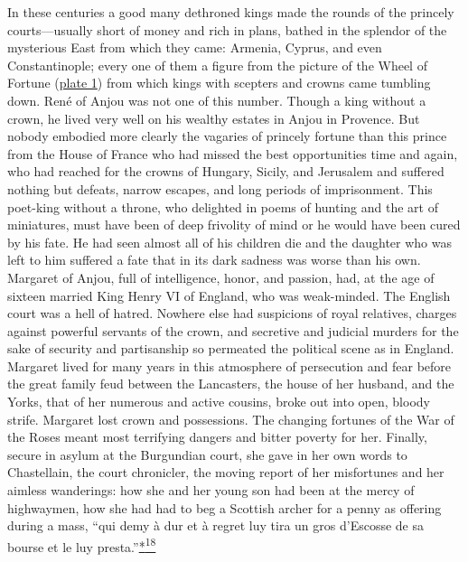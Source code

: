 In these centuries a good many dethroned kings made the rounds of the
princely courts---usually short of money and rich in plans, bathed in
the splendor of the mysterious East from which they came: Armenia,
Cyprus, and even Constantinople; every one of them a figure from the
picture of the Wheel of Fortune
(\protect\hyperlink{20_ILLUSTRATIONS_FOLLOW_PAGE.xhtmlux5cux23id_2}{plate
1}) from which kings with scepters and crowns came tumbling down. René
of Anjou was not one of this number. Though a king without a crown, he
lived very well on his wealthy estates in Anjou in Provence. But nobody
embodied more clearly the vagaries of princely fortune than this prince
from the House of France who had missed the best opportunities time and
again, who had reached for the crowns of Hungary, Sicily, and Jerusalem
and suffered nothing but defeats, narrow escapes, and long periods of
imprisonment. This poet-king without a throne, who delighted in poems of
hunting and the art of miniatures, must have been of deep frivolity of
mind or he would have been cured by his fate. He had seen almost all of
his children die and the daughter who was left to him suffered a fate
that in its dark sadness was worse than his own. Margaret of Anjou, full
of intelligence, honor, and passion, had, at the age of sixteen married
King Henry VI of England, who was weak-minded. The English court was a
hell of hatred. Nowhere else had suspicions of royal relatives, charges
against powerful servants of the crown, and secretive and judicial
murders for the sake
\protect\hypertarget{08_Chapter_One__THE_PASSIONATE_INTE.xhtmlux5cux23page_14}{}{}of
security and partisanship so permeated the political scene as in
England. Margaret lived for many years in this atmosphere of persecution
and fear before the great family feud between the Lancasters, the house
of her husband, and the Yorks, that of her numerous and active cousins,
broke out into open, bloody strife. Margaret lost crown and possessions.
The changing fortunes of the War of the Roses meant most terrifying
dangers and bitter poverty for her. Finally, secure in asylum at the
Burgundian court, she gave in her own words to Chastellain, the court
chronicler, the moving report of her misfortunes and her aimless
wanderings: how she and her young son had been at the mercy of
highwaymen, how she had had to beg a Scottish archer for a penny as
offering during a mass, ``qui demy à dur et à regret luy tira un gros
d'Escosse de sa bourse et le luy
presta.''\protect\hypertarget{08_Chapter_One__THE_PASSIONATE_INTE.xhtmlux5cux23id_2283}{\protect\hyperlink{23_NOTES.xhtmlux5cux23id_2282}{*\textsuperscript{18}}}
